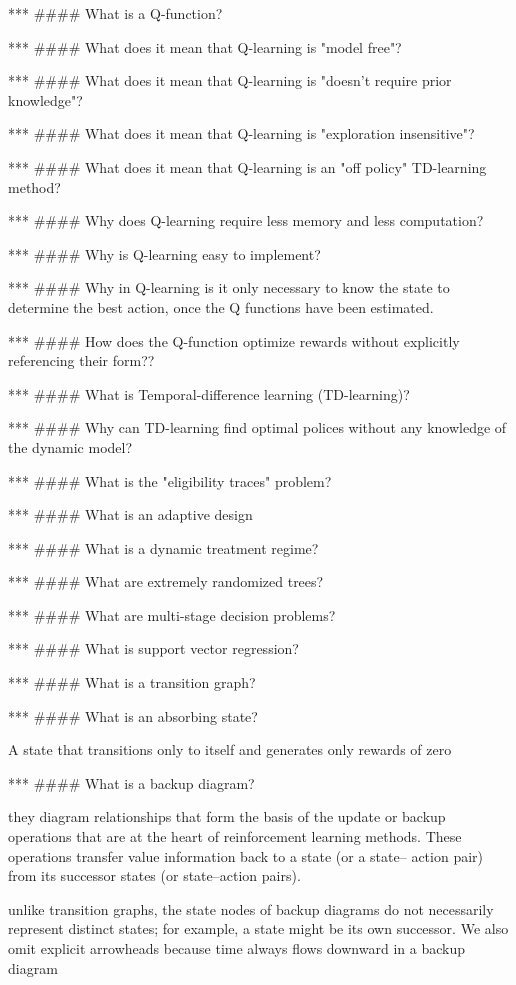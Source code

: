 \documentclass[10pt]{article}
\begin{document}
***
#### What is a Q-function?

***
#### What does it mean that Q-learning is "model free"?

***
#### What does it mean that Q-learning is "doesn't require prior knowledge"?

***
#### What does it mean that Q-learning is "exploration insensitive"?

***
#### What does it mean that Q-learning is an "off policy" TD-learning method?

***
#### Why does Q-learning require less memory and less computation?

***
#### Why is Q-learning easy to implement?

***
#### Why in Q-learning is it only necessary to know the state to determine the best action, once the Q functions have been estimated.

***
#### How does the Q-function optimize rewards without explicitly referencing their form??

***
#### What is Temporal-difference learning (TD-learning)?

***
#### Why can TD-learning find optimal polices without any knowledge of the dynamic model?

***
#### What is the "eligibility traces" problem?

***
#### What is an adaptive design

***
#### What is a dynamic treatment regime?

***
#### What are extremely randomized trees?

***
#### What are multi-stage decision problems?

***
#### What is support vector regression?

***
#### What is a transition graph?


***
#### What is an absorbing state?

A state that transitions only to itself and generates only rewards of zero

***
#### What is a backup diagram?

they diagram relationships that form the basis of the update or backup operations that are at the heart of reinforcement learning methods. These operations transfer value information back to a state (or a state– action pair) from its successor states (or state–action pairs).

unlike transition graphs, the state nodes of backup diagrams do not necessarily represent distinct states; for example, a state might be its own successor. We also omit explicit arrowheads because time always flows downward in a backup diagram
\end{document}
